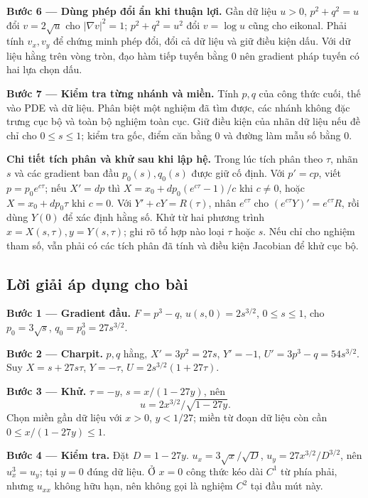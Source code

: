 \documentclass[10pt,a4paper]{article}
\begin{document}
\textbf{Bước 6 — Dùng phép đổi ẩn khi thuận lợi.} Gần dữ liệu $u>0$, $p^2+q^2=u$ đổi $v=2\sqrt u$ cho $|\nabla v|^2=1$; $p^2+q^2=u^2$ đổi $v=\log u$ cũng cho eikonal. Phải tính $v_x,v_y$ để chứng minh phép đổi, đổi cả dữ liệu và giữ điều kiện dấu. Với dữ liệu hằng trên vòng tròn, đạo hàm tiếp tuyến bằng 0 nên gradient pháp tuyến có hai lựa chọn dấu.

\textbf{Bước 7 — Kiểm tra từng nhánh và miền.} Tính $p,q$ của công thức cuối, thế vào PDE và dữ liệu. Phân biệt một nghiệm đã tìm được, các nhánh không đặc trưng cục bộ và toàn bộ nghiệm toàn cục. Giữ điều kiện của nhãn dữ liệu nếu đề chỉ cho $0\le s\le1$; kiểm tra gốc, điểm căn bằng 0 và đường làm mẫu số bằng 0.

\textbf{Chi tiết tích phân và khử sau khi lập hệ.} Trong lúc tích phân theo $\tau$, nhãn $s$ và các gradient ban đầu $p_0(s),q_0(s)$ được giữ cố định. Với $p'=cp$, viết $p=p_0e^{c\tau}$; nếu $X'=dp$ thì $X=x_0+dp_0(e^{c\tau}-1)/c$ khi $c\ne0$, hoặc $X=x_0+dp_0\tau$ khi $c=0$. Với $Y'+cY=R(\tau)$, nhân $e^{c\tau}$ cho $(e^{c\tau}Y)'=e^{c\tau}R$, rồi dùng $Y(0)$ để xác định hằng số. Khử từ hai phương trình $x=X(s,\tau),y=Y(s,\tau)$; ghi rõ tổ hợp nào loại $\tau$ hoặc $s$. Nếu chỉ cho nghiệm tham số, vẫn phải có các tích phân đã tính và điều kiện Jacobian để khử cục bộ.
\subsection*{Lời giải áp dụng cho bài}
\textbf{Bước 1 — Gradient đầu.} $F=p^3-q$, $u(s,0)=2s^{3/2}$, $0\le s\le1$, cho $p_0=3\sqrt s$, $q_0=p_0^3=27s^{3/2}$.

\textbf{Bước 2 — Charpit.} $p,q$ hằng, $X'=3p^2=27s$, $Y'=-1$, $U'=3p^3-q=54s^{3/2}$. Suy $X=s+27s\tau$, $Y=-\tau$, $U=2s^{3/2}(1+27\tau)$.

\textbf{Bước 3 — Khử.} $\tau=-y$, $s=x/(1-27y)$, nên
\[u=2x^{3/2}/\sqrt{1-27y}.\]
Chọn miền gần dữ liệu với $x>0$, $y<1/27$; miền từ đoạn dữ liệu còn cần $0\le x/(1-27y)\le1$.

\textbf{Bước 4 — Kiểm tra.} Đặt $D=1-27y$. $u_x=3\sqrt{x}/\sqrt D$, $u_y=27x^{3/2}/D^{3/2}$, nên $u_x^3=u_y$; tại $y=0$ đúng dữ liệu. Ở $x=0$ công thức kéo dài $C^1$ từ phía phải, nhưng $u_{xx}$ không hữu hạn, nên không gọi là nghiệm $C^2$ tại đầu mút này.
\end{document}
